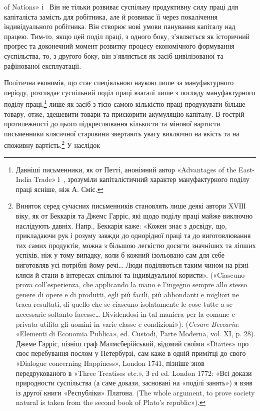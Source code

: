 \parcont{}  %
of Nations» і~ Він не тільки розвиває суспільну продуктивну
силу праці для капіталіста замість для робітника, але й розвиває
її через покалічення індивідуального робітника. Він створює
нові умови панування капіталу над працею. Тим-то, якщо цей
поділ праці, з одного боку, з’являється як історичний проґрес
та доконечний момент розвитку процесу економічного формування
суспільства, то, з другого боку, він з’являється як засіб
цивілізованої та рафінованої експлуатації.

Політична економія, що стає спеціяльною наукою лише за
мануфактурного періоду, розглядає суспільний поділ праці взагалі
лише з погляду мануфактурного поділу праці,\footnote{
Давніші письменники, як от Петті, анонімний автор «Advantages
of the East-India Trade» і~, зрозуміли капіталістичний характер
мануфактурного поділу праці ясніше, ніж А. Сміс.
} лише як
засіб з тією самою кількістю праці продукувати більше товару,
отже, здешевити товари та прискорити акумуляцію капіталу.
В гострій протилежності до цього підкреслювання кількости та
мінової вартости письменники клясичної старовини звертають
увагу виключно на якість та на споживну вартість.\footnote{
Виняток серед сучасних письменників становлять лише деякі
автори XVІІІ віку, як от Беккарія та Джемс Гарріс, які щодо поділу
праці майже виключно наслідують давніх. Напр., Беккарія каже: «Кожен
знає з досвіду, що, прикладаючи рук і розуму завжди до однорідної праці
та до виготовлювання тих самих продуктів, можна з більшою легкістю
досягти значніших та ліпших успіхів, ніж у тому випадку, коли б кожний
ізольовано сам для себе виготовляв усі потрібні йому речі\dots{} Люди поділяються
таким чином на різні кляси й стани в інтересах спільної та індивідуальної
користи». («Ciascuno prova coll’esperienza, che applicando
la mano e l’ingegno sempre allo stesso genere di opere e di produtti, egli
più facili, più abbondanti e migliori ne traca resultati, di quello che se
ciascuno isolatamente le cose tutte a se necessarie soltanto facesse\dots{} Dividendosi
in tal maniera per la comune e privata utilita gli uomini
in varie classe e condizioni»). (\emph{Cesare Beccaria}: «Elementi di Economia
Publica», ed. Custodi, Parte Moderna, vol. XI, p. 28). Джеме
Гарріс, пізніш граф Малмсберійський, відомий своїми «Diaries» про
своє перебування послом у Петербурзі, сам каже в одній примітці до
свого «Dialogue concerning Happiness», London 1741, пізніше знов передрукованого
в «Three Treatises etc.», З rd ed. London 1772: «Всі докази
природности суспільства (а саме докази, засновані на «поділі занять»)
я взяв із другої книги «Республіки» Платона. (The whole argument,
to prove society natural is taken from the second book of Plato’s
republic»).
} У наслідок
